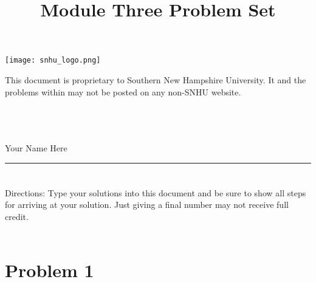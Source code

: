 \documentclass{amsart}
\theoremstyle{definition}
\theoremstyle{Exercise}
\theoremstyle{remark}
\theoremstyle{rule}
\numberwithin{equation}{section}
\begin{document}
\begin{center}
\texttt{[image: snhu\_logo.png]}
\end{center}
\title{\sf Module Three Problem Set}%


\maketitle
This document is proprietary to Southern New Hampshire University. It and the problems within may not be posted on any non-SNHU website.\\\\\\\\
\begin{center}
Your Name Here
\end{center}


\begin{center}
\rule{\textwidth}{0.4pt}
\end{center}


\newpage
\section*{}
\section*{}
Directions: Type your solutions into this document and be sure to show all steps for arriving at your solution. Just giving a final number may not receive full credit.
\\\\




\section*{Problem 1}
\end{document}
